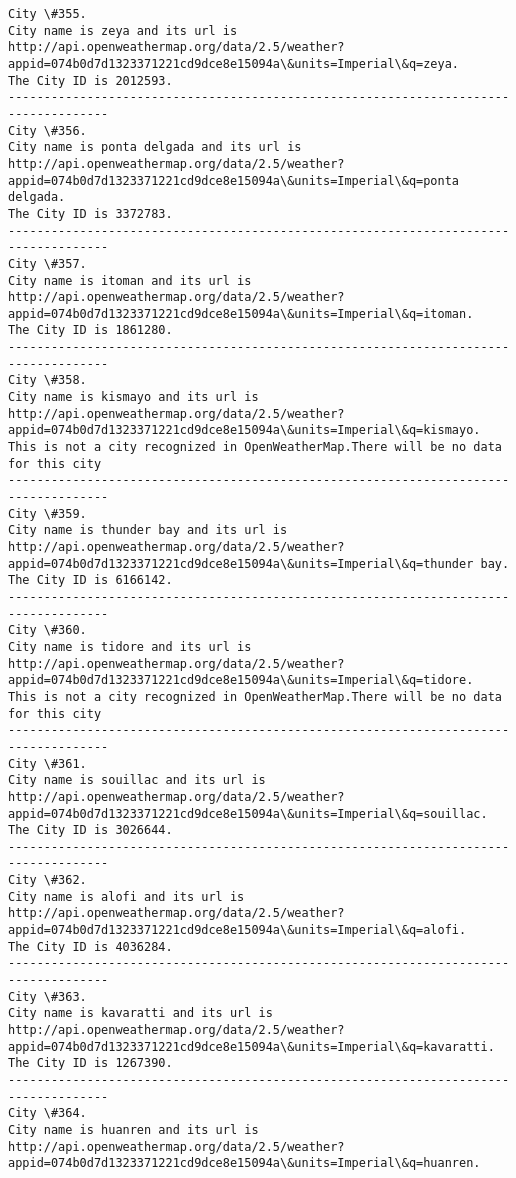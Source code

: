 \documentclass[11pt]{article}
\begin{document}
\begin{Verbatim}[commandchars=\\\{\}]
City \#355.
City name is zeya and its url is http://api.openweathermap.org/data/2.5/weather?appid=074b0d7d1323371221cd9dce8e15094a\&units=Imperial\&q=zeya.
The City ID is 2012593.
------------------------------------------------------------------------------------
City \#356.
City name is ponta delgada and its url is http://api.openweathermap.org/data/2.5/weather?appid=074b0d7d1323371221cd9dce8e15094a\&units=Imperial\&q=ponta delgada.
The City ID is 3372783.
------------------------------------------------------------------------------------
City \#357.
City name is itoman and its url is http://api.openweathermap.org/data/2.5/weather?appid=074b0d7d1323371221cd9dce8e15094a\&units=Imperial\&q=itoman.
The City ID is 1861280.
------------------------------------------------------------------------------------
City \#358.
City name is kismayo and its url is http://api.openweathermap.org/data/2.5/weather?appid=074b0d7d1323371221cd9dce8e15094a\&units=Imperial\&q=kismayo.
This is not a city recognized in OpenWeatherMap.There will be no data for this city
------------------------------------------------------------------------------------
City \#359.
City name is thunder bay and its url is http://api.openweathermap.org/data/2.5/weather?appid=074b0d7d1323371221cd9dce8e15094a\&units=Imperial\&q=thunder bay.
The City ID is 6166142.
------------------------------------------------------------------------------------
City \#360.
City name is tidore and its url is http://api.openweathermap.org/data/2.5/weather?appid=074b0d7d1323371221cd9dce8e15094a\&units=Imperial\&q=tidore.
This is not a city recognized in OpenWeatherMap.There will be no data for this city
------------------------------------------------------------------------------------
City \#361.
City name is souillac and its url is http://api.openweathermap.org/data/2.5/weather?appid=074b0d7d1323371221cd9dce8e15094a\&units=Imperial\&q=souillac.
The City ID is 3026644.
------------------------------------------------------------------------------------
City \#362.
City name is alofi and its url is http://api.openweathermap.org/data/2.5/weather?appid=074b0d7d1323371221cd9dce8e15094a\&units=Imperial\&q=alofi.
The City ID is 4036284.
------------------------------------------------------------------------------------
City \#363.
City name is kavaratti and its url is http://api.openweathermap.org/data/2.5/weather?appid=074b0d7d1323371221cd9dce8e15094a\&units=Imperial\&q=kavaratti.
The City ID is 1267390.
------------------------------------------------------------------------------------
City \#364.
City name is huanren and its url is http://api.openweathermap.org/data/2.5/weather?appid=074b0d7d1323371221cd9dce8e15094a\&units=Imperial\&q=huanren.

\end{Verbatim}
\end{document}

